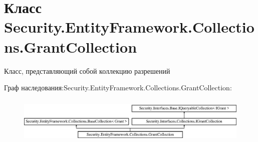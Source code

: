 \hypertarget{class_security_1_1_entity_framework_1_1_collections_1_1_grant_collection}{}\section{Класс Security.\+Entity\+Framework.\+Collections.\+Grant\+Collection}
\label{class_security_1_1_entity_framework_1_1_collections_1_1_grant_collection}


Класс, представляющий собой коллекцию разрешений  


Граф наследования\+:Security.\+Entity\+Framework.\+Collections.\+Grant\+Collection\+:\begin{figure}[H]
\begin{center}
\leavevmode
\includegraphics[height=2.245989cm]{d0/d05/class_security_1_1_entity_framework_1_1_collections_1_1_grant_collection}
\end{center}
\end{figure}
